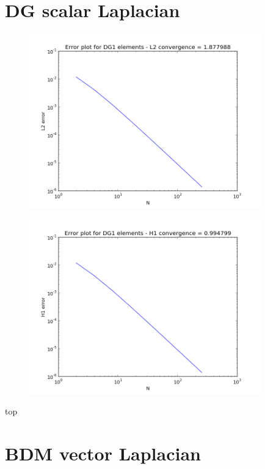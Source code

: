 \documentclass[12pt]{extarticle}
\numberwithin{equation}{section}    %
\begin{document}
\pagestyle{fancyplain}
\fancyhead{}
\fancyfoot{} %
\fancyfoot[LE,RO]{\thepage \hspace{-5mm}}
\fancyfoot[CO,RE]{}










\section*{DG scalar Laplacian}

\begin{figure}[h!]
\centering
\includegraphics[width=10cm]{Plots/DGlapL2}
\end{figure}

\begin{figure}[h!]
\centering
\includegraphics[width=10cm]{Plots/DGlapH1}
\end{figure}

top
\section*{BDM vector Laplacian}
\end{document}
